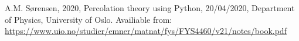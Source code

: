 \documentclass[reprint, amsmath, amssymb, aps]{revtex4-2}
\begin{document}

\clearpage
\begin{thebibliography}{9}
   A.M. Sørensen, 2020, Percolation theory using Python, 20/04/2020, Department of Physics, University of Oslo. Availiable from: \url{https://www.uio.no/studier/emner/matnat/fys/FYS4460/v21/notes/book.pdf}
\end{thebibliography}
\end{document}

